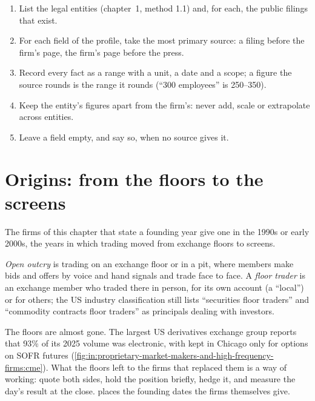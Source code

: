 \begin{method}\label{met:in:proprietary-market-makers-and-high-frequency-firms:build}
\begin{enumerate}
\item List the legal entities (chapter~1, method 1.1) and, for each, the public filings that exist.
\item For each field of the profile, take the most primary source: a filing before the firm's page, the firm's page
before the press.
\item Record every fact as a range with a unit, a date and a scope; a figure the source rounds is the range it rounds
(``300 employees'' is 250--350).
\item Keep the entity's figures apart from the firm's: never add, scale or extrapolate across entities.
\item Leave a field empty, and say so, when no source gives it.
\end{enumerate}
\end{method}

\section{Origins: from the floors to the screens}

The firms of this chapter that state a founding year give one in the 1990s or early 2000s, the years in which
trading moved from exchange floors to screens.

\begin{definition}\label{def:in:proprietary-market-makers-and-high-frequency-firms:floor}
\emph{Open outcry} is trading on an exchange floor or in a pit, where members make bids and offers
by voice and hand signals and trade face to face. A \emph{floor trader} is an exchange member who
traded there in person, for its own account (a ``local'') or for others; the US industry classification still lists
``securities floor traders'' and ``commodity contracts floor traders'' as principals dealing with investors.
\end{definition}

The floors are almost gone. The largest US derivatives exchange group reports that 93\% of its 2025 volume was
electronic, with  kept in Chicago only for options on SOFR futures
(\cref{fig:in:proprietary-market-makers-and-high-frequency-firms:cme}). What the floors left to the firms that
replaced them is a way of working: quote both sides, hold the position briefly, hedge it, and measure the day's result
at the close.  places the founding dates the
firms themselves give.

